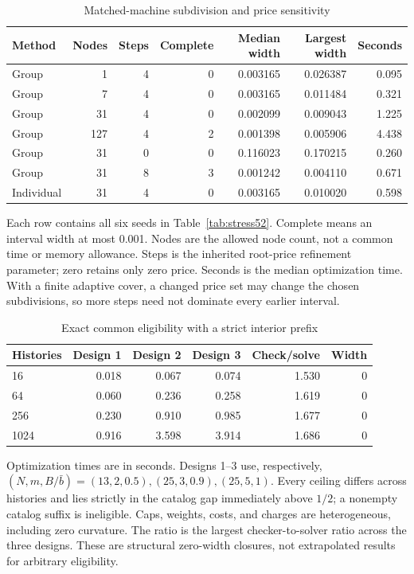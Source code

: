 \begin{table}[p]\centering
\caption{Matched-machine subdivision and price sensitivity}\label{tab:baseline52}
\setlength{\tabcolsep}{4pt}
\begin{tabular}{lrrrrrr}
\toprule
Method & Nodes & Steps & Complete & Median width & Largest width & Seconds\\
\midrule
Group & 1 & 4 & 0 & 0.003165 & 0.026387 & 0.095\\
Group & 7 & 4 & 0 & 0.003165 & 0.011484 & 0.321\\
Group & 31 & 4 & 0 & 0.002099 & 0.009043 & 1.225\\
Group & 127 & 4 & 2 & 0.001398 & 0.005906 & 4.438\\
Group & 31 & 0 & 0 & 0.116023 & 0.170215 & 0.260\\
Group & 31 & 8 & 3 & 0.001242 & 0.004110 & 0.671\\
Individual & 31 & 4 & 0 & 0.003165 & 0.010020 & 0.598\\
\bottomrule\end{tabular}
\par\vspace{6pt}\begin{minipage}{\textwidth}Each row contains all six seeds in Table~\ref{tab:stress52}. Complete means an interval width at most 0.001. Nodes are the allowed node count, not a common time or memory allowance. Steps is the inherited root-price refinement parameter; zero retains only zero price. Seconds is the median optimization time. With a finite adaptive cover, a changed price set may change the chosen subdivisions, so more steps need not dominate every earlier interval.\end{minipage}
\end{table}
\begin{table}[p]\centering
\caption{Exact common eligibility with a strict interior prefix}\label{tab:strict52}
\setlength{\tabcolsep}{4pt}
\begin{tabular}{lrrrrr}
\toprule
Histories & Design 1 & Design 2 & Design 3 & Check/solve & Width\\
\midrule
16 & 0.018 & 0.067 & 0.074 & 1.530 & 0\\
64 & 0.060 & 0.236 & 0.258 & 1.619 & 0\\
256 & 0.230 & 0.910 & 0.985 & 1.677 & 0\\
1024 & 0.916 & 3.598 & 3.914 & 1.686 & 0\\
\bottomrule\end{tabular}
\par\vspace{6pt}\begin{minipage}{\textwidth}Optimization times are in seconds. Designs 1--3 use, respectively, $(N,m,B/\bar b)=(13,2,0.5),(25,3,0.9),(25,5,1)$. Every ceiling differs across histories and lies strictly in the catalog gap immediately above $1/2$; a nonempty catalog suffix is ineligible. Caps, weights, costs, and charges are heterogeneous, including zero curvature. The ratio is the largest checker-to-solver ratio across the three designs. These are structural zero-width closures, not extrapolated results for arbitrary eligibility.\end{minipage}
\end{table}
